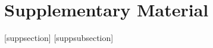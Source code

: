 \section*{Supplementary Material}

[suppsection]
[suppsubsection]

\setcounter{suppsection}{0}
\setcounter{figure}{0}
\setcounter{table}{0}

\renewcommand{\thesuppsection}{S\arabic{suppsection}}
\renewcommand{\thesuppsubsection}{S\arabic{suppsection}.\arabic{suppsubsection}}
\renewcommand{\thesuppsubsubsection}{S\arabic{suppsection}.\arabic{suppsubsection}.\arabic{suppsubsubsection}}
\renewcommand{\thefigure}{S\arabic{figure}}
\renewcommand{\thetable}{S\arabic{table}}

\let\oldsection\section
\let\oldsubsection\subsection
\let\oldsubsubsection\subsubsection

\renewcommand{\section}[2][\empty]{%
  \refstepcounter{suppsection}%
  \ifx\empty#1
    \oldsection*{\thesuppsection\quad#2}%
  \else
    \oldsection*{\thesuppsection\quad#2\label{#1}}%
  \fi
}

\renewcommand{\subsection}[1]{%
  \refstepcounter{suppsubsection}%
  \oldsubsection*{\thesuppsubsection\quad#1}%
}

\renewcommand{\subsubsection}[1]{%
  \refstepcounter{suppsubsubsection}%
  \oldsubsubsection*{\thesuppsubsubsection\quad#1}%
}

